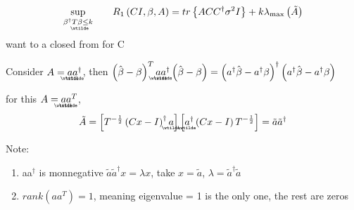 \documentclass{article}
\begin{document}
\begin{equation}
\underset{\beta ^{\dagger }T%
\underaccent{\wtilde}{\beta}%
\leq k}{\sup }\qquad R_{1}\left( CI,\beta ,A\right) =tr\left\{ ACC^{\dagger
}\sigma ^{2}I\right\} +k\lambda _{\max }\left( \tilde{A}\right)
\end{equation}%
want to a closed from for C

\bigskip

Consider $A=%
\underaccent{\wtilde}{a}%
\underaccent{\wtilde}{a}%
^{\dagger }$, then $\left( \hat{\beta}-\beta \right) ^{T}%
\underaccent{\wtilde}{a}%
\underaccent{\wtilde}{a}%
^{\dagger }\left( \hat{\beta}-\beta \right) =\left( a^{\dagger }\hat{\beta}%
-a^{\dagger }\beta \right) ^{\dagger }\left( a^{\dagger }\hat{\beta}%
-a^{\dagger }\beta \right) $

for this $A=%
\underaccent{\wtilde}{a}%
\underaccent{\wtilde}{a}%
^{T}$, 
\begin{equation}
\tilde{A}=\left[ T^{-\frac{1}{2}}\left( Cx-I\right) ^{\dagger }%
\underaccent{\wtilde}{a}%
\right] \left[ 
\underaccent{\wtilde}{a}%
^{\dagger }\left( Cx-I\right) T^{-\frac{1}{2}}\right] =\tilde{a}\tilde{a}%
^{\dagger }
\end{equation}

Note:{}

\begin{enumerate}
\item aa$^{\dagger }$ is monnegative $\tilde{a}\tilde{a}^{\dagger }x=\lambda
x$, take $x=\tilde{a}$, $\lambda =\tilde{a}^{\dagger }\tilde{a}$

\item $rank\left( aa^{T}\right) =1$, meaning eigenvalue = 1 is the only one,
the rest are zeros
\end{enumerate}
\end{document}
